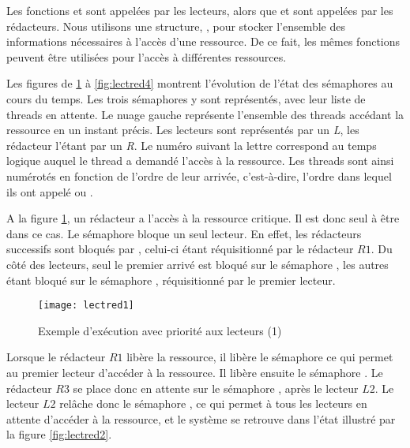 Les fonctions  et  sont appelées par les lecteurs, alors que  et  sont appelées par les rédacteurs. Nous utilisons une structure, , pour stocker l'ensemble des informations nécessaires à l'accès d'une ressource. De ce fait, les mêmes fonctions peuvent être utilisées pour l'accès à différentes ressources.

Les figures de \ref{fig:lectred1} à \ref{fig:lectred4} montrent l'évolution de l'état des sémaphores au cours du temps. Les trois sémaphores y sont représentés, avec leur liste de threads en attente. Le nuage gauche représente l'ensemble des threads accédant la ressource en un instant précis. Les lecteurs sont représentés par un \emph{L}, les rédacteur l'étant par un \emph{R}. Le numéro suivant la lettre correspond au temps logique auquel le thread a demandé l'accès à la ressource. Les threads sont ainsi numérotés en fonction de l'ordre de leur arrivée, c'est-à-dire, l'ordre dans lequel ils ont appelé  ou .

A la figure \ref{fig:lectred1}, un rédacteur a l'accès à la ressource critique. Il est donc seul à être dans ce cas. Le sémaphore  bloque un seul lecteur. En effet, les rédacteurs successifs sont bloqués par , celui-ci étant réquisitionné par le rédacteur $R1$. Du côté des lecteurs, seul le premier arrivé est bloqué sur le sémaphore , les autres étant bloqué sur le sémaphore , réquisitionné par le premier lecteur.

\begin{figure}[!ht]
  \begin{center}
    \texttt{[image: lectred1]}
    \caption{\label{fig:lectred1}Exemple d'exécution avec priorité aux lecteurs (1)}
  \end{center}
\end{figure}

Lorsque le rédacteur $R1$ libère la ressource, il libère le sémaphore  ce qui permet au premier lecteur d'accéder à la ressource.
Il libère ensuite le sémaphore . Le rédacteur $R3$ se place donc en attente sur le sémaphore , après le lecteur $L2$.
Le lecteur $L2$ relâche donc le sémaphore , ce qui permet à tous les lecteurs en attente d'accéder à la ressource, et le système se retrouve dans l'état illustré par la figure \ref{fig:lectred2}.

